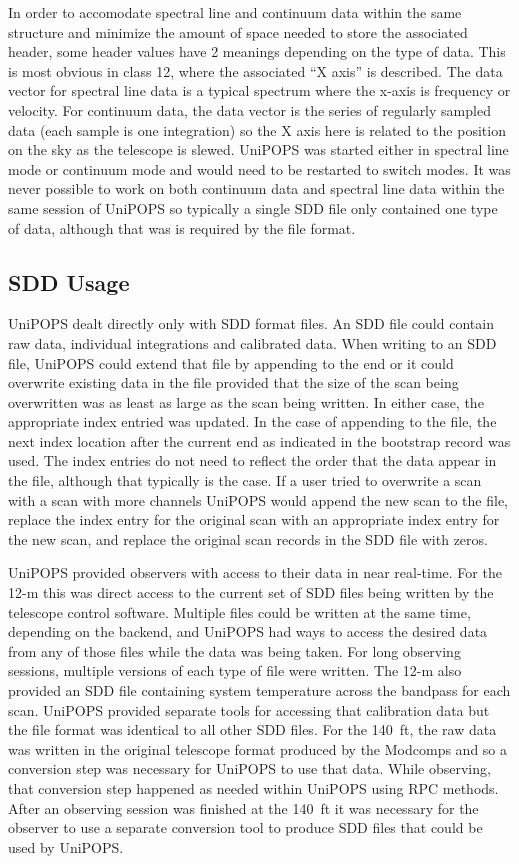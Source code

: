 \documentclass[final,authoryear,5p,times,twocolumn]{elsarticle}
\begin{document}
In order to accomodate spectral line and continuum data within the
same structure and minimize the amount of space needed to store the
associated header, some header values have 2 meanings depending on the
type of data.  This is most obvious in class 12, where the associated
``X axis'' is described.  The data vector for spectral line data is a
typical spectrum where the x-axis is frequency or velocity.  For
continuum data, the data vector is the series of regularly sampled
data (each sample is one integration) so the X axis here is related to
the position on the sky as the telescope is slewed.  UniPOPS was
started either in spectral line mode or continuum mode and would need
to be restarted to switch modes.  It was never possible to work on
both continuum data and spectral line data within the same session of
UniPOPS so typically a single SDD file only contained one type of
data, although that was is required by the file format.

\subsection{SDD Usage}

UniPOPS dealt directly only with SDD format files.  An SDD file could
contain raw data, individual integrations and calibrated data. When
writing to an SDD file, UniPOPS could extend that file by appending to
the end or it could overwrite existing data in the file provided that
the size of the scan being overwritten was as least as large as the
scan being written.  In either case, the appropriate index entried was
updated.  In the case of appending to the file, the next index
location after the current end as indicated in the bootstrap record
was used.  The index entries do not need to reflect the order that the
data appear in the file, although that typically is the case.  If a
user tried to overwrite a scan with a scan with more channels UniPOPS
would append the new scan to the file, replace the index entry for the
original scan with an appropriate index entry for the new scan, and
replace the original scan records in the SDD file with zeros.

UniPOPS provided observers with access to their data in near
real-time.  For the 12-m this was direct access to the current set of
SDD files being written by the telescope control software.  Multiple
files could be written at the same time, depending on the backend, and
UniPOPS had ways to access the desired data from any of those files
while the data was being taken.  For long observing sessions, multiple
versions of each type of file were written. The 12-m also provided an
SDD file containing system temperature across the bandpass for each
scan.  UniPOPS provided separate tools for accessing that calibration
data but the file format was identical to all other SDD files.  For
the 140\, ft, the raw data was written in the original telescope
format produced by the Modcomps and so a conversion step was necessary
for UniPOPS to use that data.  While observing, that conversion step
happened as needed within UniPOPS using RPC methods.  After an
observing session was finished at the 140\, ft it was necessary for
the observer to use a separate conversion tool to produce SDD files
that could be used by UniPOPS.
\end{document}
